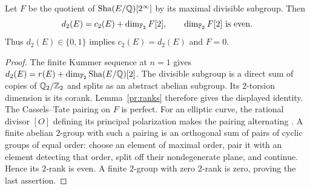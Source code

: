 \begin{lemma}\label{pr:finite-descent}
Let $F$ be the quotient of $\operatorname{Sha}(E/\mathbb Q)[2^\infty]$ by its maximal
divisible subgroup. Then
\[
 d_2(E)=c_2(E)+\dim_{\mathbb F_2}F[2],
 \qquad \dim_{\mathbb F_2}F[2]\text{ is even}.
\]
Thus $d_2(E)\in\{0,1\}$ implies $c_2(E)=d_2(E)$ and $F=0$.
\end{lemma}

\begin{proof}
The finite Kummer sequence at $n=1$ gives
$d_2(E)=r(E)+\dim_{\mathbb F_2}\operatorname{Sha}(E/\mathbb Q)[2]$.
The divisible subgroup is a direct sum of copies of
$\mathbb Q_2/\mathbb Z_2$ and splits as an abstract abelian subgroup.
Its $2$-torsion dimension is its corank. Lemma~\ref{pr:ranks}
therefore gives the displayed identity.
The Cassels--Tate pairing on $F$ is perfect. For an elliptic curve,
the rational divisor $[O]$ defining its principal polarization makes
the pairing alternating
\citep[Chapter~I, Remark~6.10(b) and Theorem~6.13(a)]{MilneADT2006}.
A finite abelian $2$-group with such a pairing is an orthogonal sum
of pairs of cyclic groups of equal order: choose an element of
maximal order, pair it with an element detecting that order, split
off their nondegenerate plane, and continue. Hence its $2$-rank
is even. A finite $2$-group with zero $2$-rank is zero, proving
the last assertion.
\end{proof}
